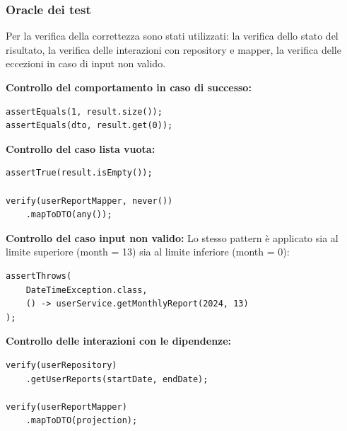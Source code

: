 \documentclass[a4paper,12pt]{article}
\begin{document}
\subsubsection{Oracle dei test}
Per la verifica della correttezza sono stati utilizzati: la verifica dello stato del risultato, la verifica delle interazioni con repository e mapper, la verifica delle eccezioni in caso di input non valido.

\textbf{Controllo del comportamento in caso di successo:}
\begin{lstlisting}
assertEquals(1, result.size());
assertEquals(dto, result.get(0));
\end{lstlisting}

\textbf{Controllo del caso lista vuota:}
\begin{lstlisting}
assertTrue(result.isEmpty());

verify(userReportMapper, never())
    .mapToDTO(any());
\end{lstlisting}

\textbf{Controllo del caso input non valido:}
Lo stesso pattern è applicato sia al limite superiore (month = 13) sia al limite inferiore (month = 0):
\begin{lstlisting}
assertThrows(
    DateTimeException.class,
    () -> userService.getMonthlyReport(2024, 13)
);
\end{lstlisting}

\textbf{Controllo delle interazioni con le dipendenze:}
\begin{lstlisting}
verify(userRepository)
    .getUserReports(startDate, endDate);

verify(userReportMapper)
    .mapToDTO(projection);
\end{lstlisting}


\printindex
\end{document}

